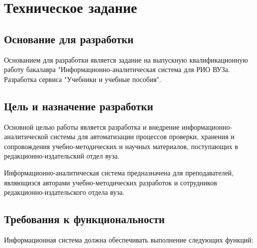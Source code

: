 \section{Техническое задание}

\subsection{Основание для разработки}

Основанием для разработки является задание на выпускную квалификационную работу бакалавра "Информационно-аналитическая система для РИО ВУЗа. Разработка сервиса "Учебники и учебные пособия".

\subsection{Цель и назначение разработки}

Основной целью работы является разработка и внедрение информационно-аналитической системы для автоматизации процессов проверки, хранения и сопровождения учебно-методических и научных материалов, поступающих в редакционно-издательский отдел вуза.

Информационно-аналитическая система предназначена для преподавателей, являющизся авторами учебно-методических разработок и сотрудников редакционно-издательского отдела вуза.

\subsection{Требования к функциональности}

Информационная система должна обеспечивать выполнение следующих функций:

